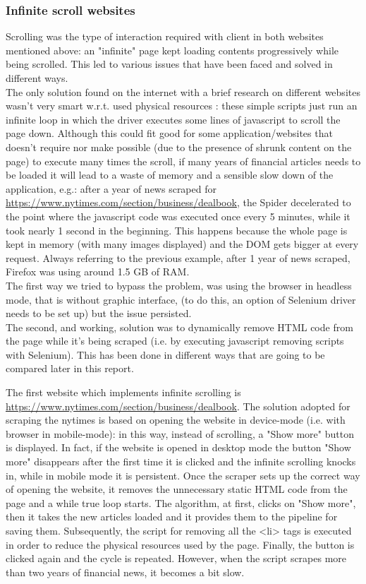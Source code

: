 \subsubsection{Infinite scroll websites}
Scrolling was the type of interaction required with client in both websites mentioned above: an "infinite" page kept loading contents progressively while being scrolled. This led to various issues that have been faced and solved in different ways. \\
The only solution found on the internet with a brief research on different websites wasn't very smart w.r.t. used physical resources \cite{currentscrollsolution}: these simple scripts just run an infinite loop in which the driver executes some lines of javascript to scroll the page down. Although this could fit good for some application/websites that doesn't require nor make possible (due to the presence of shrunk content on the page) to execute many times the scroll, if many years of financial articles needs to be loaded it will lead to a waste of memory and a sensible slow down of the application, e.g.:  after a year of news scraped for \url{https://www.nytimes.com/section/business/dealbook}, the Spider decelerated to the point where the javascript code was executed once every 5 minutes, while it took nearly 1 second in the beginning. This happens because the whole page is kept in memory (with many images displayed) and the DOM gets bigger at every request. Always referring to the previous example, after 1 year of news scraped, Firefox was using around 1.5 GB of RAM. \\
The first way we tried to bypass the problem, was using the browser in headless mode, that is without graphic interface, (to do this, an option of Selenium driver needs to be set up) but the issue persisted. \\
The second, and working, solution was to dynamically remove HTML code from the page while it's being scraped (i.e. by executing javascript removing scripts with Selenium). This has been done in different ways that are going to be compared later in this report. 
\par 
The first website which implements infinite scrolling is \url{https://www.nytimes.com/section/business/dealbook}. The solution adopted for scraping the nytimes is based on opening the website in device-mode (i.e. with browser in mobile-mode): in this way, instead of scrolling, a "Show more" button is displayed. In fact, if the website is opened in desktop mode the button "Show more" disappears after the first time it is clicked and the infinite scrolling knocks in, while in mobile mode it is persistent. Once the scraper sets up the correct way of opening the website, it removes the unnecessary static HTML code from the page and a while true loop starts. The algorithm, at first, clicks on "Show more", then it takes the new articles loaded and it provides them to the pipeline for saving them. Subsequently, the script for removing all the <li> tags is executed in order to reduce the physical resources used by the page. Finally, the button is clicked again and the cycle is repeated. However, when the script scrapes more than two years of financial news, it becomes a bit slow. 
